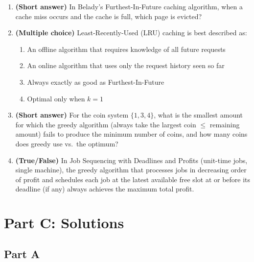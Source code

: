 \documentclass[11pt]{article}
\begin{document}
\begin{enumerate}[label=\textbf{B\arabic*.}, leftmargin=2.2em]
\item \textbf{(Short answer)} In Belady's Furthest-In-Future caching algorithm, when a
cache miss occurs and the cache is full, which page is evicted?

\item \textbf{(Multiple choice)} Least-Recently-Used (LRU) caching is best described as:
\begin{enumerate}[label=(\alph*)]
    \item An offline algorithm that requires knowledge of all future requests
    \item An online algorithm that uses only the request history seen so far
    \item Always exactly as good as Furthest-In-Future
    \item Optimal only when $k=1$
\end{enumerate}

\item \textbf{(Short answer)} For the coin system $\{1, 3, 4\}$, what is the smallest
amount for which the greedy algorithm (always take the largest coin $\le$ remaining
amount) fails to produce the minimum number of coins, and how many coins does greedy use
vs.\ the optimum?

\item \textbf{(True/False)} In Job Sequencing with Deadlines and Profits (unit-time jobs,
single machine), the greedy algorithm that processes jobs in decreasing order of profit
and schedules each job at the latest available free slot at or before its deadline (if
any) always achieves the maximum total profit.

\end{enumerate}

\newpage
\section*{Part C: Solutions}

\subsection*{Part A}
\end{document}
